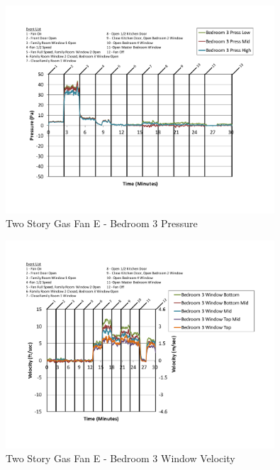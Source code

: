 \documentclass{article}
\begin{document}
\begin{appendices}
	\begin{figure}[H]
		\centering
		\includegraphics[height=3.05in,trim=0.67in 1.1in 0.67in 0.8in,clip=true]{0_Images/Results_Charts/ColdFlow/Two_Story/Gas/E/Bedroom_3_Pressure.pdf}
		\caption{Two Story Gas Fan E - Bedroom 3 Pressure}
	\end{figure}
 

	\begin{figure}[H]
		\centering
		\includegraphics[height=3.05in,trim=0.67in 1.1in 0.67in 0.8in,clip=true]{0_Images/Results_Charts/ColdFlow/Two_Story/Gas/E/Bedroom_3_Window_Velocity.pdf}
		\caption{Two Story Gas Fan E - Bedroom 3 Window Velocity}
	\end{figure}
 
	\clearpage


\end{appendices}
\end{document}
